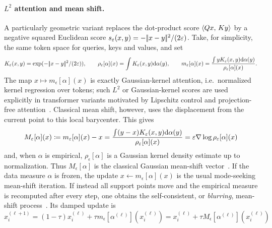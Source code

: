 \paragraph{$L^2$ attention and mean shift.}

A particularly geometric variant replaces the dot-product score \(\langle Qx,\,Ky\rangle\) by a negative squared Euclidean score \(s_\varepsilon(x,y)=-|\!| x-y |\!|^2/(2\varepsilon)\). Take, for simplicity, the same token space for queries, keys and values, and set
\[
	K_\varepsilon(x,y)=\exp(-|\!| x-y |\!|^2/(2\varepsilon)),
	\qquad
	\rho_\varepsilon[\alpha](x)=\int K_\varepsilon(x,y)\mathrm{d}\alpha(y),
	\qquad
	m_\varepsilon[\alpha](x)
	=
	\frac{\int yK_\varepsilon(x,y)\mathrm{d}\alpha(y)}
	     {\rho_\varepsilon[\alpha](x)}.
\]
The map $x\mapsto m_\epsilon[\alpha](x)$ is exactly Gaussian-kernel attention, i.e.\ normalized kernel regression over tokens; such $L^2$ or Gaussian-kernel scores are used explicitly in transformer variants motivated by Lipschitz control and projection-free attention~\citep{KimPapamakariosMnih2020L2SelfAttention,KunduGhoshGhoshHonavar2026GaussianKernelAttention}. Classical mean shift, however, uses the displacement from the current point to this local barycenter. This gives
\begin{equation}\label{eq-l2-attention-mean-shift}
	M_\varepsilon[\alpha](x)
	\coloneqq
	m_\varepsilon[\alpha](x)-x
	=
	\frac{\int (y-x)K_\varepsilon(x,y)\mathrm{d}\alpha(y)}
	     {\rho_\varepsilon[\alpha](x)}
	=
	\varepsilon\nabla\log\rho_\varepsilon[\alpha](x)
\end{equation}
and, when $\alpha$ is empirical, $\rho_\epsilon[\alpha]$ is a Gaussian kernel density estimate up to normalization. Thus \(M_\epsilon[\alpha]\) is the classical Gaussian mean-shift vector~\citep{FukunagaHostetler1975,Cheng1995MeanShift,ComaniciuMeer2002MeanShift}. If the data measure $\alpha$ is frozen, the update $x\leftarrow m_\epsilon[\alpha](x)$ is the usual mode-seeking mean-shift iteration. If instead all support points move and the empirical measure is recomputed after every step, one obtains the self-consistent, or \emph{blurring}, mean-shift process~\citep{Chen2015BlurringMeanShift}. Its damped update is
\[
	x_i^{(\ell+1)}
	=
	(1-\tau)x_i^{(\ell)}+\tau m_\epsilon[\alpha^{(\ell)}](x_i^{(\ell)})
	=
	x_i^{(\ell)}+\tau M_\epsilon[\alpha^{(\ell)}](x_i^{(\ell)})
\]
